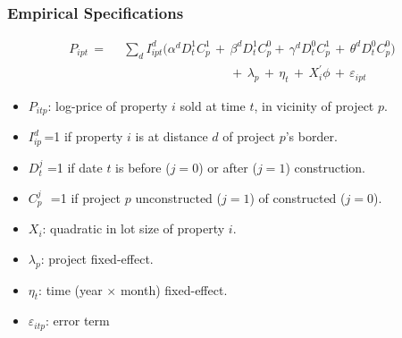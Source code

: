 \documentclass[aspectratio=32]{beamer}
\begin{document}

\begin{frame}
\frametitle{Empirical Specifications}
\begin{equation*}
\begin{split}
P_{ipt} \, = & \,\,\,  \sum\limits_{d} I^d_{ipt}\Big( \alpha^d D^1_tC^1_p \, + \, \beta^dD^1_tC^0_p + \, \gamma^dD^0_tC^1_p \, + \, \theta^dD^0_tC^0_p \Big ) \\ 
&\quad\quad\quad\quad\quad\quad\quad\quad\quad + \, \lambda_p \,  + \, \eta_{t} \, +\,  X^{'}_{i}\phi \, + \, \varepsilon_{ipt}
\end{split}
\end{equation*}

\begin{itemize}
\item $P_{itp}$: log-price of property $i$ sold at time $t$, in vicinity of project $p$.
\item $I^d_{ip}$\,=1 if property $i$ is at distance $d$ of project $p$'s border.
\item $D^j_{t}$ =1 if date $t$ is before ($j=0$) or after ($j=1$) construction. 
\item $C^j_{p}\,\,$ =1 if project $p$ unconstructed ($j=1$) of constructed ($j=0$).
\item $X_{i}$: quadratic in lot size of property $i$.
\item $\lambda_p$: project fixed-effect.
\item $\eta_{t}$: time (year$\,\times\,$month) fixed-effect.

\item $\varepsilon_{itp}$: error term
\end{itemize}
\end{frame}

\end{document}
